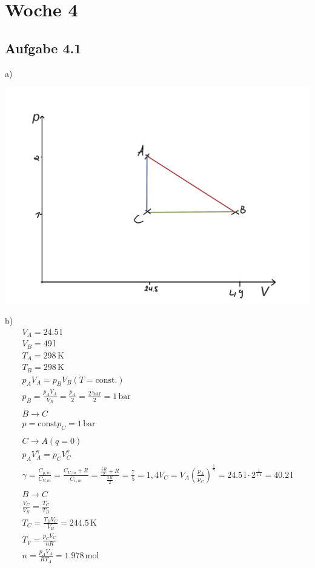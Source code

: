 \documentclass{article}
\begin{document}
\section*{Woche 4}
\subsection*{Aufgabe 4.1}
a)
\begin{center}
    \includegraphics[width=500pt]{img/What.png}
\end{center}
b)\begin{eqnarray*}
    V_A = 24.5\,\mathrm{l}\\
    V_B = 49\,\mathrm{l}\\
    T_A = 298\,\mathrm{K}\\
    T_B = 298\,\mathrm{K}\\
    p_AV_A=p_BV_B (T=\mathrm{const.})\\
    p_B=\frac{p_AV_A}{V_B}=\frac{p_A}{2} = \frac{2\,\mathrm{bar}}{2} = 1\,\mathrm{bar}\\\\
    B\rightarrow C\\
    p = \mathrm{const} p_C = 1\,\mathrm{bar}\\\\
    C\rightarrow A (q = 0)\\
    p_AV_A^\gamma = p_CV_C^\gamma\\
    \gamma = \frac{C_{p,m}}{C_{V,m}} = \frac{C_{V,m}+R}{C_{v,m}} = \frac{\frac{5R}{2}+R}{\frac{5R}{2}} = \frac{7}{5}= 1,4
    V_C = V_A \left(\frac{p_A}{p_C}\right)^\frac{1}{\gamma} = 24.5\,\mathrm{l}\cdot 2^\frac{1}{1.4} = 40.2\,\mathrm{l}\\\\
    B\rightarrow C\\
    \frac{V_C}{V_B} = \frac{T_C}{T_B}\\
    T_C = \frac{T_BV_C}{V_B} = 244.5\,\mathrm{K}\\
    T_V = \frac{p_CV_C}{nR}\\
    n=\frac{p_AV_A}{RT_A} = 1.978\,\mathrm{mol}
\end{eqnarray*}
\end{document}
